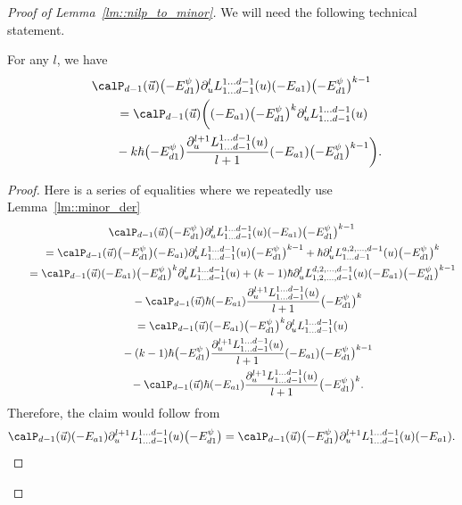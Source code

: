 \begin{proof}[Proof of Lemma~\ref{lm::nilp_to_minor}]
		We will need the following technical statement.
		\begin{Lemma}
			For any $l$, we have
			\begin{gather*}
				\calP_{d-1}(\vec{u})\bigl(-E_{d1}^{\psi}\bigr) \partial^l_u L_{1\dots d-1}^{1\dots d-1}(u) (-E_{a1}) \bigl(-E_{d1}^{\psi}\bigr)^{k-1} \\
				\qquad=\calP_{d-1}(\vec{u}) \biggl((-E_{a1}) \bigl(-E_{d1}^{\psi}\bigr)^k \partial_u^l L_{1\dots d-1}^{1\dots d-1}(u) \\
\phantom{\qquad=}{}  - k\hbar \bigl(-E_{d1}^{\psi}\bigr) \frac{\partial_u^{l+1} L_{1\dots d-1}^{1\dots d-1}(u)}{l+1} (-E_{a1}) \bigl(-E_{d1}^{\psi}\bigr)^{k-1} \biggr).
			\end{gather*}
			\begin{proof}
				Here is a series of equalities where we repeatedly use Lemma~\ref{lm::minor_der}
				\begin{gather*}
					\calP_{d-1}(\vec{u})\bigl(-E_{d1}^{\psi}\bigr)\partial^l_u L_{1\dots d-1}^{1\dots d-1}(u) (-E_{a1}) \bigl(-E_{d1}^{\psi}\bigr)^{k-1} \\
					\qquad= \calP_{d-1}(\vec{u})\bigl(-E_{d1}^{\psi}\bigr)(-E_{a1}) \partial^l_u L_{1\dots d-1}^{1\dots d-1}(u) \bigl(-E_{d1}^{\psi}\bigr)^{k-1} + \hbar \partial_u^l L_{1\dots d-1}^{a,2,\dots,d-1}(u) \bigl(-E_{d1}^{\psi}\bigr)^{k} \\
				\qquad	= \calP_{d-1}(\vec{u})(-E_{a1}) \bigl(-E_{d1}^{\psi}\bigr)^{k} \partial^l_u L_{1\dots d-1}^{1\dots d-1}(u) + (k-1)\hbar \partial_u^l L_{1,2,\dots,d-1}^{d,2,\dots,d-1}(u)(-E_{a1}) \bigl(-E_{d1}^{\psi}\bigr)^{k-1} \\
				\phantom{\qquad=}{}	-\calP_{d-1}(\vec{u}) \hbar (-E_{a1}) \frac{\partial_u^{l+1} L_{1\dots d-1}^{1\dots d-1}(u)}{l+1} \bigl(-E_{d1}^{\psi}\bigr)^k \\
					\qquad=\calP_{d-1}(\vec{u})(-E_{a1}) \bigl(-E_{d1}^{\psi}\bigr)^{k} \partial^l_u L_{1\dots d-1}^{1\dots d-1}(u) \\
				\phantom{\qquad=}{}- (k-1)\hbar \bigl(-E_{d1}^{\psi}\bigr) \frac{\partial_u^{l+1} L_{1\dots d-1}^{1\dots d-1}(u)}{l+1} (-E_{a1}) \bigl(-E_{d1}^{\psi}\bigr)^{k-1} \\
				\phantom{\qquad=}{}	-\calP_{d-1}(\vec{u}) \hbar (-E_{a1}) \frac{\partial_u^{l+1} L_{1\dots d-1}^{1\dots d-1}(u)}{l+1} \bigl(-E_{d1}^{\psi}\bigr)^k.
				\end{gather*}
				Therefore, the claim would follow from
				\[
				\calP_{d-1}(\vec{u})(-E_{a1}) \partial_u^{l+1} L_{1\dots d-1}^{1\dots d-1}(u) \bigl(-E_{d1}^{\psi}\bigr) = \calP_{d-1}(\vec{u})\bigl(-E_{d1}^{\psi}\bigr) \partial_u^{l+1} L_{1\dots d-1}^{1\dots d-1}(u) (-E_{a1}).
\]
\end{proof}
\end{Lemma}
\end{proof}
